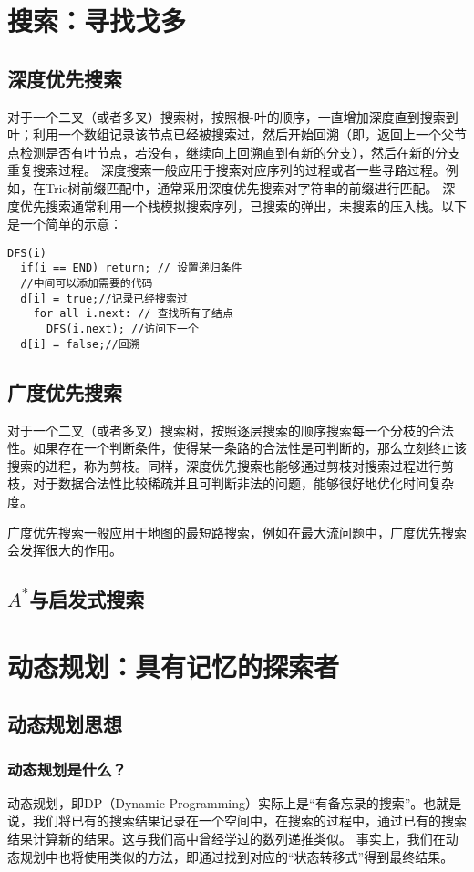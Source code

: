 \documentclass[12pt,a4paper,UTF16]{ctexbook}
\theoremstyle{plain}
\begin{document}
\chapter{搜索：寻找戈多}
\section{深度优先搜索}
对于一个二叉（或者多叉）搜索树，按照根-叶的顺序，一直增加深度直到搜索到叶；利用一个数组记录该节点已经被搜索过，然后开始回溯（即，返回上一个父节点检测是否有叶节点，若没有，继续向上回溯直到有新的分支），然后在新的分支重复搜索过程。
深度搜索一般应用于搜索对应序列的过程或者一些寻路过程。例如，在Trie树前缀匹配中，通常采用深度优先搜索对字符串的前缀进行匹配。
深度优先搜索通常利用一个栈模拟搜索序列，已搜索的弹出，未搜索的压入栈。以下是一个简单的示意：
\begin{lstlisting}[basicstyle=\ttfamily]
DFS(i)
  if(i == END) return; // 设置递归条件
  //中间可以添加需要的代码
  d[i] = true;//记录已经搜索过
    for all i.next: // 查找所有子结点
      DFS(i.next); //访问下一个
  d[i] = false;//回溯
\end{lstlisting}
\section{广度优先搜索}
对于一个二叉（或者多叉）搜索树，按照逐层搜索的顺序搜索每一个分枝的合法性。如果存在一个判断条件，使得某一条路的合法性是可判断的，那么立刻终止该搜索的进程，称为剪枝。同样，深度优先搜索也能够通过剪枝对搜索过程进行剪枝，对于数据合法性比较稀疏并且可判断非法的问题，能够很好地优化时间复杂度。


广度优先搜索一般应用于地图的最短路搜索，例如在最大流问题中，广度优先搜索会发挥很大的作用。
\section{$A^*$与启发式搜索}

\chapter{动态规划：具有记忆的探索者}
\section{动态规划思想}
\subsection{动态规划是什么？}
动态规划，即DP（Dynamic Programming）实际上是“有备忘录的搜索”。也就是说，我们将已有的搜索结果记录在一个空间中，在搜索的过程中，通过已有的搜索结果计算新的结果。这与我们高中曾经学过的数列递推类似。
事实上，我们在动态规划中也将使用类似的方法，即通过找到对应的“状态转移式”得到最终结果。
\end{document}
